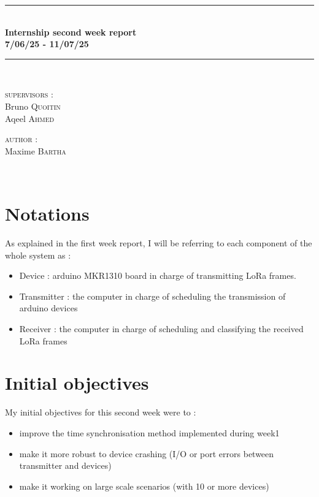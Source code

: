 \documentclass[a4paper, 12pt]{article}
\newcommand{\HRule}{\rule{\linewidth}{0.3mm}}
\begin{document}
\begin{center}
\HRule \\[0.3cm]
{ \LARGE \bfseries Internship second week report \\[0.3cm]}
{ \LARGE \bfseries 7/06/25 - 11/07/25 \\[0.1cm]}
\HRule \\[1.5cm]

\begin{minipage}[t]{0.45\textwidth}
\begin{flushleft} \large
\textsc{supervisors :}\\
Bruno \textsc{Quoitin}\\
Aqeel \textsc{Ahmed}\\
\end{flushleft}

\end{minipage}
\begin{minipage}[t]{0.45\textwidth}
\begin{flushright} \large
\textsc{author :}\\
Maxime \textsc{Bartha}\\
\end{flushright}
\end{minipage}\\[2ex]
\end{center}

\section{Notations}
As explained in the first week report, I will be referring to each component of the whole system as : 
\begin{itemize}
  \item Device : arduino MKR1310 board in charge of transmitting LoRa frames.
  \item Transmitter : the computer in charge of scheduling the transmission of arduino devices
  \item Receiver : the computer in charge of scheduling and classifying the received LoRa frames
\end{itemize}

\section{Initial objectives}
My initial objectives for this second week were to :
\begin{itemize}
  \item improve the time synchronisation method implemented during week1
  \item make it more robust to device crashing (I/O or port errors between transmitter and devices)
  \item make it working on large scale scenarios (with 10 or more devices)
\end{itemize}
\end{document}
